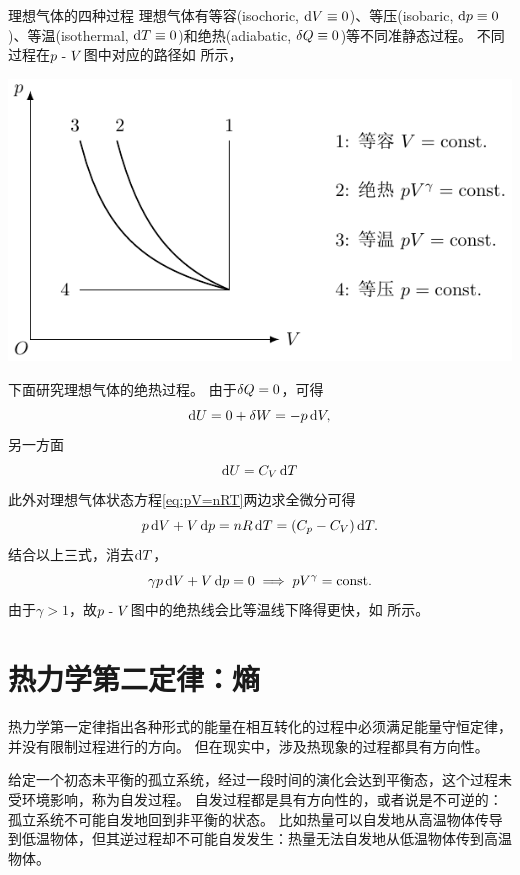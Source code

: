\begin{example}
	{理想气体的四种过程}{}
	理想气体有等容(isochoric, $\mathop{}\!\mathrm{d} V\equiv 0$)、等压(isobaric, $\mathop{}\!\mathrm{d} p\equiv 0$)、等温(isothermal, $\mathop{}\!\mathrm{d} T\equiv 0$)和绝热(adiabatic, $\mathop{}\!\delta Q\equiv 0$)等不同准静态过程。
	不同过程在$p~\text{-}~ V$图中对应的路径如 所示，
	\begin{center}
		\includegraphics[page=1]{figures/tikz/coordinates.pdf}
		\label{fig:ideal p-V}
	\end{center}
	\tcblower
	下面研究理想气体的绝热过程。
	由于$\mathop{}\!\delta Q=0$，可得
	\[
		\mathop{}\!\mathrm{d} U=0+\mathop{}\!\delta W=-p\mathop{}\!\mathrm{d} V,
	\]
	另一方面
	\[
		\mathop{}\!\mathrm{d} U=C_V\mathop{}\!\mathrm{d} T
	\]
	此外对理想气体状态方程\eqref{eq:pV=nRT}两边求全微分可得
	\[
		p\mathop{}\!\mathrm{d} V+V\mathop{}\!\mathrm{d} p=nR\mathop{}\!\mathrm{d} T=(C_p-C_V)\mathop{}\!\mathrm{d} T.
	\]
	结合以上三式，消去$\mathop{}\!\mathrm{d} T$，%
	\begin{equation}
		\label{eq:adiabatic}
		\gamma p\mathop{}\!\mathrm{d} V+V\mathop{}\!\mathrm{d} p=0\implies pV^\gamma=\text{const}.
	\end{equation}
	由于$\gamma>1$，故$p~\text{-}~ V$图中的绝热线会比等温线下降得更快，如 所示。
\end{example}

\section{热力学第二定律：熵}

热力学第一定律指出各种形式的能量在相互转化的过程中必须满足能量守恒定律，并没有限制过程进行的方向。
但在现实中，涉及热现象的过程都具有方向性。

给定一个初态未平衡的孤立系统，经过一段时间的演化会达到平衡态，这个过程未受环境影响，称为自发过程。
自发过程都是具有方向性的，或者说是不可逆的：
孤立系统不可能自发地回到非平衡的状态。
比如热量可以自发地从高温物体传导到低温物体，但其逆过程却不可能自发发生：热量无法自发地从低温物体传到高温物体。

